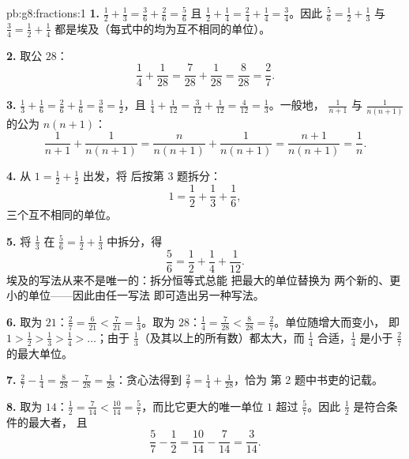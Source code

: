 \begin{solution}{pb:g8:fractions:1}
\textbf{1.} $\frac12 + \frac13 = \frac36 + \frac26 = \frac56$ 且
$\frac12 + \frac14 = \frac24 + \frac14 = \frac34$。因此
$\frac56 = \frac12 + \frac13$ 与 $\frac34 = \frac12 + \frac14$
都是埃及（每式中的均为互不相同的单位）。

\textbf{2.} 取公 $28$：
\[
\frac14 + \frac{1}{28} = \frac{7}{28} + \frac{1}{28}
= \frac{8}{28} = \frac{2}{7} .
\]

\textbf{3.} $\frac13 + \frac16 = \frac26 + \frac16 = \frac36 =
\frac12$，且 $\frac14 + \frac{1}{12} = \frac{3}{12} +
\frac{1}{12} = \frac{4}{12} = \frac13$。一般地，
$\frac{1}{n+1}$ 与 $\frac{1}{n(n+1)}$ 的公为
$n(n+1)$：
\[
\frac{1}{n+1} + \frac{1}{n(n+1)}
= \frac{n}{n(n+1)} + \frac{1}{n(n+1)}
= \frac{n+1}{n(n+1)}
= \frac{1}{n} .
\]

\textbf{4.} 从 $1 = \frac12 + \frac12$ 出发，将
后按第 3 题拆分：
\[
1 = \frac12 + \frac13 + \frac16 ,
\]
三个互不相同的单位。

\textbf{5.} 将 $\frac13$ 在 $\frac56 = \frac12 +
\frac13$ 中拆分，得
\[
\frac56 = \frac12 + \frac14 + \frac{1}{12} .
\]
埃及的写法从来不是唯一的：拆分恒等式总能
把最大的单位替换为
两个新的、更小的单位——因此由任一写法
即可造出另一种写法。

\textbf{6.} 取为 $21$：$\frac27 = \frac{6}{21} <
\frac{7}{21} = \frac13$。取为 $28$：$\frac14 =
\frac{7}{28} < \frac{8}{28} = \frac27$。单位随增大而变小，
即 $1 > \frac12 > \frac13 > \frac14 >
\dots$；由于 $\frac13$（及其以上的所有数）都太大，而
$\frac14$ 合适，$\frac14$ 是小于
$\frac27$ 的最大单位。

\textbf{7.} $\frac27 - \frac14 = \frac{8}{28} - \frac{7}{28} =
\frac{1}{28}$：贪心法得到
$\frac27 = \frac14 + \frac{1}{28}$，恰为
第 2 题中书吏的记载。

\textbf{8.} 取为 $14$：$\frac12 = \frac{7}{14} <
\frac{10}{14} = \frac57$，而比它更大的唯一单位
$1$ 超过 $\frac57$。因此 $\frac12$ 是符合条件的最大者，
且
\[
\frac57 - \frac12 = \frac{10}{14} - \frac{7}{14} = \frac{3}{14} .
\]


\end{solution}
